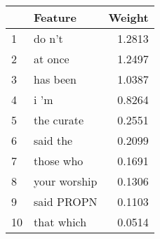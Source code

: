 \begin{tabular}{llr}
\toprule
{} &       Feature &  Weight \\
\midrule
1  &        do n't &  1.2813 \\
2  &       at once &  1.2497 \\
3  &      has been &  1.0387 \\
4  &          i 'm &  0.8264 \\
5  &    the curate &  0.2551 \\
6  &      said the &  0.2099 \\
7  &     those who &  0.1691 \\
8  &  your worship &  0.1306 \\
9  &    said PROPN &  0.1103 \\
10 &    that which &  0.0514 \\
\bottomrule
\end{tabular}
